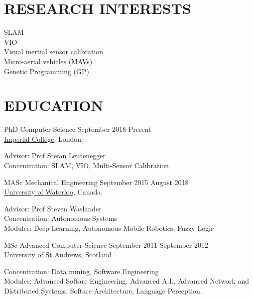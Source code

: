 \documentclass[line,margin]{cv}
\begin{document}

\address{Email: \href{mailto:chutsu@gmail.com}{chutsu@gmail.com}}
\address{Website: \href{http://chutsu.github.io}{http://chutsu.github.io}}


\begin{resume}

\section{RESEARCH INTERESTS}
SLAM \\
VIO \\
Visual inertial sensor calibration \\
Micro-aerial vehicles (MAVs) \\
Genetic Programming (GP)



\section{EDUCATION}
PhD Computer Science
\hfill September 2018 \textemdash{} Present \\
\href{http://www.imperial.ac.uk}{Imperial College}, London.

\vspace{0.1em}
\begin{adjustwidth}{2.0em}{2.0em}
	Advisor: Prof Stefan Leutenegger \\
	Concentration: SLAM, VIO, Multi-Sensor Calibration
\end{adjustwidth}


MASc Mechanical Engineering
\hfill September 2015 \textemdash{} August 2018 \\
\href{http://www.uwaterloo.ca}{University of Waterloo}, Canada.

\vspace{0.1em}
\begin{adjustwidth}{2.0em}{2.0em}
	Advisor: Prof Steven Waslander \\
	Concentration: Autonomous Systems \\
	Modules: Deep Learning, Autonomous Mobile Robotics, Fuzzy Logic
\end{adjustwidth}


MSc Advanced Computer Science
\hfill September 2011 \textemdash{} September 2012 \\
\href{http://www.st-andrews.ac.uk}{University of St Andrews}, Scotland

\vspace{0.1em}
\begin{adjustwidth}{2.0em}{2.0em}
	Concentration: Data mining, Software Engineering \\
	Modules: Advanced Softare Engineering, Advanced A.I., Advanced Network
	and Distributed Systems, Softare Architecture, Language Perception.
\end{adjustwidth}



\end{resume}
\end{document}
